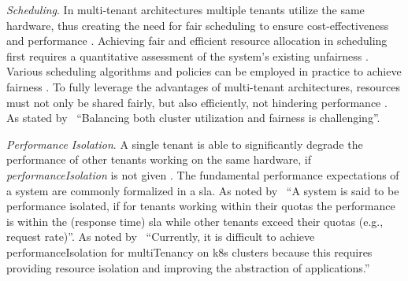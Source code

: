 \documentclass[11pt, a4paper, oneside, listof=totoc]{scrartcl}
\begin{document}
\begin{enumerate}[label={[\arabic*]:},
                    ref=Challenge~\arabic*,
                    leftmargin=*,
                    itemsep=0.6\baselineskip]
                    \item\label{chal:scheduling}
                        \textit{Scheduling}.
                        In multi-tenant architectures multiple tenants utilize the same hardware,
                        thus creating the need for fair scheduling to ensure cost-effectiveness
                        and performance \parencite[p.~32597]{simi2024}.
                        Achieving fair and efficient resource allocation in scheduling first
                        requires a quantitative assessment of the system's existing unfairness
                        \parencites[p.~7]{ebrahimi2012}[p.~14]{beltre2019}[pp.~2--3]{ghodsi2011}.
                        Various scheduling algorithms and policies can be employed in practice to
                        achieve fairness \parencites[pp.~14--16]{beltre2019}[p.~4]{ghodsi2011}.
                        To fully leverage the advantages of multi-tenant architectures, resources
                        must not only be shared fairly, but also efficiently, not hindering
                        performance \parencite[p.~14]{beltre2019}.
                        As stated by~\cite[p.~14]{beltre2019} \enquote{Balancing both cluster
                        utilization and fairness is challenging}.
                    
                    \item\label{chal:isolation}
                        \textit{Performance Isolation}.
                        A single tenant is able to significantly degrade the performance of other
                        tenants working on the same hardware, if \textit{\gls{performanceIsolation}}
                        is not given \parencite[p.~195]{krebs2013}.
                        The fundamental performance expectations of a system are commonly formalized
                        in a \acrfull{sla}.\@ %
                        As noted by~\cite[p.~195]{krebs2013} \enquote{A system is said to be
                        performance isolated, if for tenants working within their quotas the
                        performance is within the (response time) \gls{sla} while other
                        tenants exceed their quotas (e.g., request rate)}.
                        As noted by~\cite[p.~18]{carrion2022} \enquote{Currently, it is difficult
                        to achieve \gls{performanceIsolation} for \gls{multiTenancy} on \gls{k8s}
                        clusters because this requires providing resource isolation and improving
                        the abstraction of applications.}


\end{enumerate}
\end{document}
